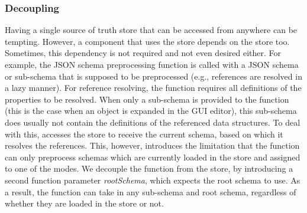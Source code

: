 \subsubsection{Decoupling}
Having a single source of truth store that can be accessed from anywhere can be tempting.
However, a component that uses the store depends on the store too.
Sometimes, this dependency is not required and not even desired either.
For example, the JSON schema preprocessing function is called with a JSON schema or sub-schema that is supposed to be preprocessed (e.g., references are resolved in a lazy manner).
For reference resolving, the function requires all definitions of the properties to be resolved. 
When only a sub-schema is provided to the function (this is the case when an object is expanded in the GUI editor), this sub-schema does usually not contain the definitions of the referenced data structures.
To deal with this, \toolname{} accesses the store to receive the current schema, based on which it resolves the references.
This, however, introduces the limitation that the function can only preprocess schemas which are currently loaded in the store and assigned to one of the modes.
We decouple the function from the store, by introducing a second function parameter \textit{rootSchema}, which expects the root schema to use. 
As a result, the function can take in any sub-schema and root schema, regardless of whether they are loaded in the store or not.

